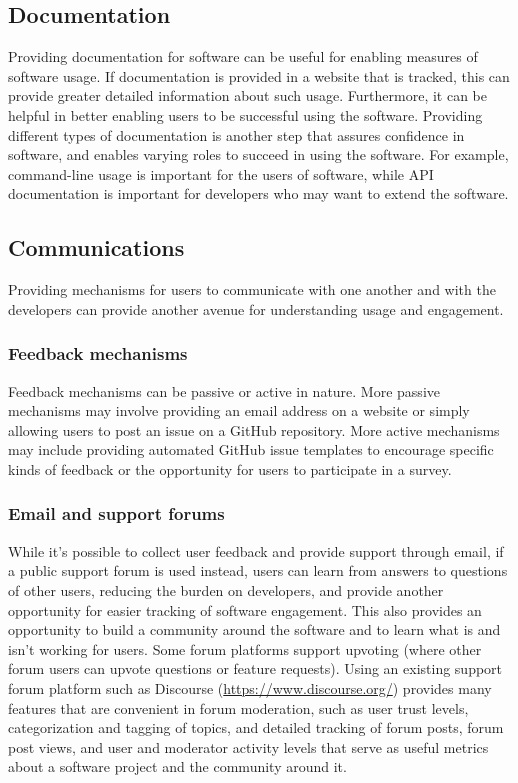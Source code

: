 \documentclass{article}
\begin{document}
\subsection{Documentation}
Providing documentation for software can be useful for enabling measures of software usage. If documentation is provided in a website that is tracked, this can provide greater detailed information about such usage. Furthermore, it can be helpful in better enabling users to be successful using the software. Providing different types of documentation is another step that assures confidence in software, and enables varying roles to succeed in using the software. For example, command-line usage is important for the users of software, while API documentation is important for developers who may want to extend the software.

\subsection{Communications} 
Providing mechanisms for users to communicate with one another and with the developers can provide another avenue for understanding usage and engagement.

\subsubsection{Feedback mechanisms}
Feedback mechanisms can be passive or active in nature. More passive mechanisms may involve providing an email address on a website or simply allowing users to post an issue on a GitHub repository. More active mechanisms may include providing automated GitHub issue templates to encourage specific kinds of feedback or the opportunity for users to participate in a survey.


\subsubsection{Email and support forums}
While it’s possible to collect user feedback and provide support through email,  if a public support forum is used instead, users can learn from answers to questions of other users, reducing the burden on developers, and provide another opportunity for easier tracking of software engagement. This also provides an opportunity to build a community around the software and to learn what is and isn’t working for users. Some forum platforms support upvoting (where other forum users can upvote questions or feature requests). Using an existing support forum platform such as Discourse (\url{https://www.discourse.org/}) provides many features that are convenient in forum moderation, such as user trust levels, categorization and tagging of topics, and detailed tracking of forum posts, forum post views, and user and moderator activity levels that serve as useful metrics about a software project and the community around it.
\end{document}
